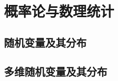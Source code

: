 \part{概率论与数理统计}
\begingroup
\def\x{\chi^2}%
\def\dotsim{\overset{.}{\sim}}%


\chapter{随机变量及其分布}





\chapter{多维随机变量及其分布}








\endgroup
